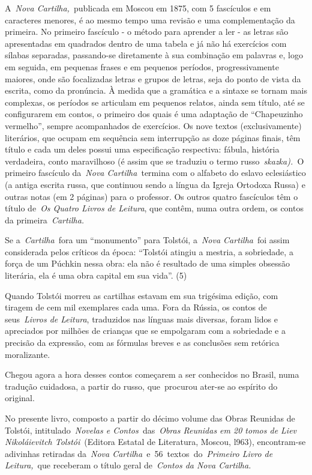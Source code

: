 A~\emph{Nova Cartilha,~}publicada em Moscou em 1875, com 5 fascículos e
em caracteres menores, é ao mesmo tempo uma revisão e uma complementação
da primeira. No primeiro fascículo - o método para aprender a ler - as
letras são apresentadas em quadrados dentro de uma tabela e já não há
exercícios com sílabas separadas, passando-se diretamente à sua
combinação em palavras e, logo em seguida, em pequenas frases e em
pequenos períodos, progressivamente maiores, onde são focalizadas letras
e grupos de letras, seja do ponto de vista da escrita, como da
pronúncia. À medida que a gramática e a sintaxe se tornam mais
complexas, os períodos se articulam em pequenos relatos, ainda sem
título, até se configurarem em contos, o primeiro dos quais é uma
adaptação de ``Chapeuzinho vermelho'', sempre acompanhados de
exercícios. Os nove textos (exclusivamente) literários, que ocupam em
sequência sem interrupção as doze páginas finais, têm título e cada um
deles possui uma especificação respectiva: fábula, história verdadeira,
conto maravilhoso (é assim que se traduziu o termo
russo~\emph{skazka).~}O primeiro fascículo da~\emph{Nova
Cartilha}~termina com o alfabeto do eslavo eclesiástico (a antiga
escrita russa, que continuou sendo a língua da Igreja Ortodoxa Russa) e
outras notas (em 2 páginas) para o professor. Os outros quatro
fascículos têm o título de~\emph{Os Quatro Livros de Leitura}, que
contêm, numa outra ordem, os contos da primeira~\emph{Cartilha.}

Se a~\emph{Cartilha~}fora um ``monumento'' para Tolstói, a~\emph{Nova
Cartilha}~foi assim considerada pelos críticos da época: ``Tolstói
atingiu a mestria, a sobriedade, a força de um Púchkin nessa obra: ela
não é resultado de uma simples obsessão literária, ela é uma obra
capital em sua vida''. (5)

Quando Tolstói morreu as cartilhas estavam em sua trigésima edição, com
tiragem de cem mil exemplares cada uma. Fora da Rússia, os contos de
seus~\emph{Livros de Leitura}, traduzidos nas línguas mais diversas,
foram lidos e apreciados por milhões de crianças que se empolgaram com a
sobriedade e a precisão da expressão, com as fórmulas breves e as
conclusões sem retórica moralizante.

Chegou agora a hora desses contos começarem a ser conhecidos no Brasil,
numa tradução cuidadosa, a partir do russo, que~procurou ater-se ao
espírito do original.

No presente livro, composto a partir do décimo volume das Obras Reunidas
de Tolstói, intitulado~\emph{Novelas e Contos~}das~\emph{Obras Reunidas
em 20 tomos de Liev Nikoláievitch Tolstói}~(Editora Estatal de
Literatura, Moscou, l963), encontram-se adivinhas retiradas
da~\emph{Nova Cartilha~}e~56~textos\emph{~}do~\emph{Primeiro Livro de
Leitura,}~que receberam o título geral de~\emph{Contos da Nova
Cartilha.}

